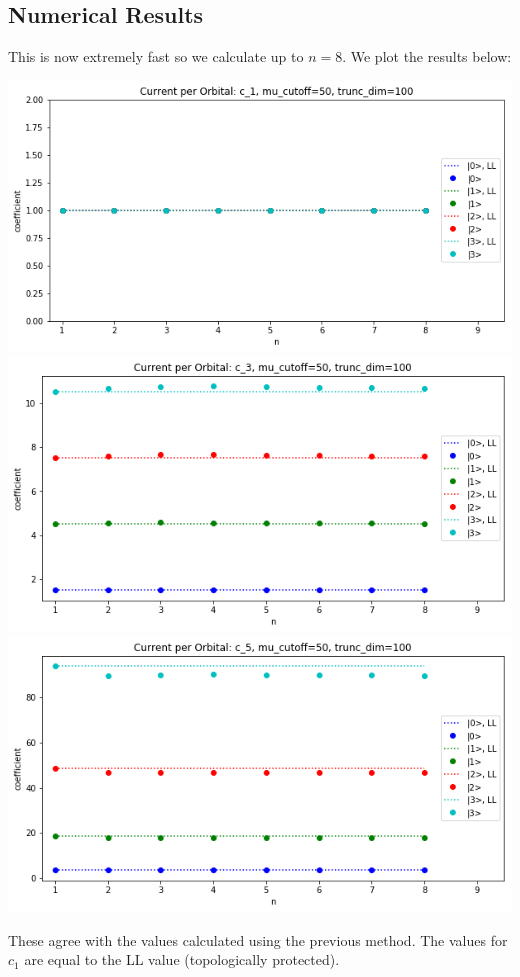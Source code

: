 \documentclass[a4paper, 10pt]{paper}
\begin{document}
\subsection{Numerical Results}
This is now extremely fast so we calculate up to $n=8$. We plot the results below:
\begin{center}
\includegraphics[scale=0.57]{Orbital_c1.png}
\includegraphics[scale=0.57]{Orbital_c3.png}
\includegraphics[scale=0.57]{Orbital_c5.png}
\end{center}
These agree with the values calculated using the previous method. The values for $c_1$ are equal to the LL value (topologically protected).
\end{document}
